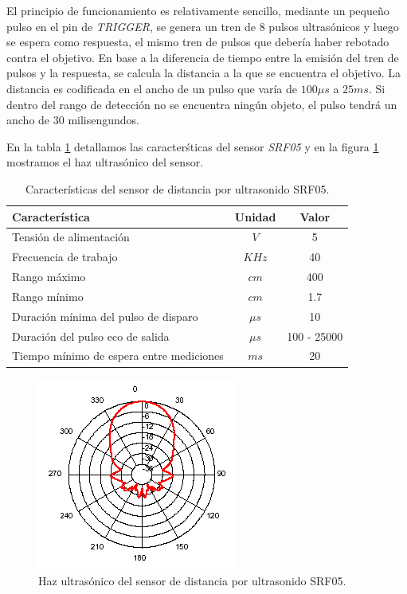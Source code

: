 El principio de funcionamiento es relativamente sencillo, mediante un peque\~no pulso en el pin de \emph{TRIGGER}, se genera un tren de $8$ pulsos
ultras\'onicos y luego se espera como respuesta, el mismo tren de pulsos que deber\'ia haber rebotado contra el objetivo. En base a la diferencia de tiempo
entre la emisi\'on del tren de pulsos y la respuesta, se calcula la distancia a la que se encuentra el objetivo. La distancia es codificada en el ancho
de un pulso que var\'ia de $100\mu s$ a $25 ms$. Si dentro del rango de detecci\'on no se encuentra ning\'un objeto, el pulso tendr\'a un ancho
de $30$ milisengundos.

En la tabla \ref{HTultrasonido} detallamos las caracter\'sticas del sensor \emph{SRF05} y en la figura \ref{HFultrasonido} mostramos el haz ultras\'onico
del sensor.

\begin{table}[ht]
	\begin{center}
		\begin{tabular}{|l|c|c|}
			\hline
			Caracter\'istica & Unidad & Valor\\
			\hline
			Tensi\'on de alimentaci\'on & $V$ & 5 \\
			Frecuencia de trabajo & $KHz$ & 40 \\
			Rango m\'aximo & $cm$ & 400 \\
			Rango m\'inimo & $cm$ & 1.7 \\
			Duración m\'inima del pulso de disparo & $\mu s$ & 10 \\
			Duración del pulso eco de salida & $\mu s$& 100 - 25000 \\
			Tiempo m\'inimo de espera entre mediciones & $m s$ & 20 \\
			\hline
		\end{tabular}
	\end{center}
	\caption{Caracter\'isticas del sensor de distancia por ultrasonido SRF05.}
	\label{HTultrasonido}
\end{table}

\begin{figure}[ht]
	\centering
	\includegraphics[scale=0.5]{us-beam.png}
	\caption{Haz ultras\'onico del sensor de distancia por ultrasonido SRF05.}
	\label{HFultrasonido}
\end{figure}

